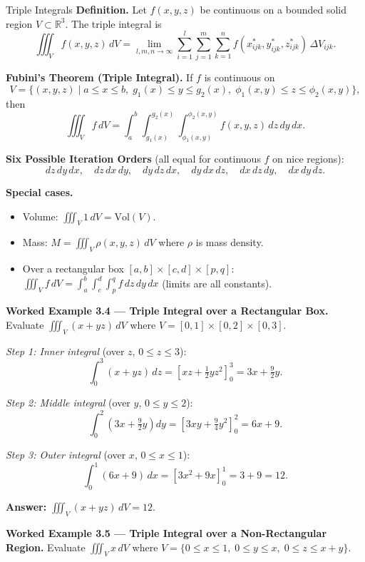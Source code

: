 \documentclass[12pt,a4paper]{article}
\begin{document}
\begin{infobox}{Triple Integrals}
\textbf{Definition.} Let \(f(x,y,z)\) be continuous on a bounded solid region \(V \subset \mathbb{R}^3\). The triple integral is
\[
  \iiint_V f(x,y,z)\,dV = \lim_{l,m,n\to\infty}\sum_{i=1}^{l}\sum_{j=1}^{m}\sum_{k=1}^{n} f(x_{ijk}^*, y_{ijk}^*, z_{ijk}^*)\,\Delta V_{ijk}.
\]

\textbf{Fubini's Theorem (Triple Integral).} If \(f\) is continuous on
\[
  V = \{(x,y,z)\mid a\le x\le b,\; g_1(x)\le y\le g_2(x),\; \phi_1(x,y)\le z\le \phi_2(x,y)\},
\]
then
\[
  \iiint_V f\,dV = \int_a^b \int_{g_1(x)}^{g_2(x)} \int_{\phi_1(x,y)}^{\phi_2(x,y)} f(x,y,z)\,dz\,dy\,dx.
\]

\textbf{Six Possible Iteration Orders} (all equal for continuous \(f\) on nice regions):
\[
  dz\,dy\,dx,\quad dz\,dx\,dy,\quad dy\,dz\,dx,\quad dy\,dx\,dz,\quad dx\,dz\,dy,\quad dx\,dy\,dz.
\]

\textbf{Special cases.}
\begin{itemize}[nosep]
  \item Volume: \(\iiint_V 1\,dV = \text{Vol}(V)\).
  \item Mass: \(M = \iiint_V \rho(x,y,z)\,dV\) where \(\rho\) is mass density.
  \item Over a rectangular box \([a,b]\times[c,d]\times[p,q]\):
    \(\iiint_V f\,dV = \int_a^b\int_c^d\int_p^q f\,dz\,dy\,dx\) (limits are all constants).
\end{itemize}
\end{infobox}

\textbf{Worked Example 3.4 --- Triple Integral over a Rectangular Box.}
Evaluate \(\displaystyle\iiint_V (x + yz)\,dV\) where \(V = [0,1]\times[0,2]\times[0,3]\).

\textit{Step 1: Inner integral} (over \(z\), \(0\le z\le 3\)):
\[
  \int_0^3 (x+yz)\,dz = \left[xz + \tfrac{1}{2}yz^2\right]_0^3 = 3x + \tfrac{9}{2}y.
\]

\textit{Step 2: Middle integral} (over \(y\), \(0\le y\le 2\)):
\[
  \int_0^2 \left(3x + \tfrac{9}{2}y\right)dy = \left[3xy + \tfrac{9}{4}y^2\right]_0^2 = 6x + 9.
\]

\textit{Step 3: Outer integral} (over \(x\), \(0\le x\le 1\)):
\[
  \int_0^1 (6x+9)\,dx = \left[3x^2 + 9x\right]_0^1 = 3 + 9 = 12.
\]

\textbf{Answer:} \(\displaystyle\iiint_V (x+yz)\,dV = 12\).

\vspace{4pt}
\textbf{Worked Example 3.5 --- Triple Integral over a Non-Rectangular Region.}
Evaluate \(\displaystyle\iiint_V x\,dV\) where \(V = \{0 \le x \le 1,\; 0 \le y \le x,\; 0 \le z \le x+y\}\).
\end{document}
